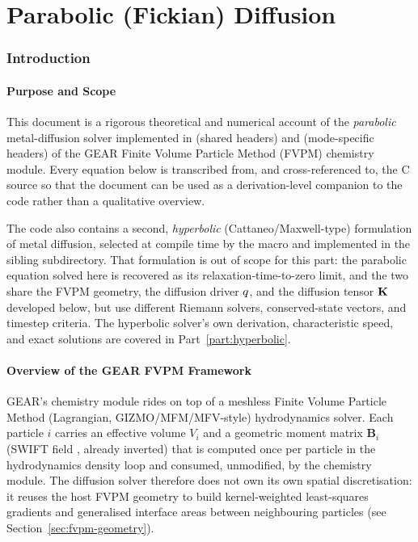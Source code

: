 
\part{Parabolic (Fickian) Diffusion}
\label{part:parabolic}

\section{Introduction}

\subsection{Purpose and Scope}
\label{sec:parabolic-scope}
This document is a rigorous theoretical and numerical account of the
\emph{parabolic} metal-diffusion solver implemented in
 (shared headers) and
 (mode-specific headers)
of the GEAR Finite Volume Particle Method (FVPM) chemistry module. Every
equation below is transcribed from, and cross-referenced to, the C source
so that the document can be used as a derivation-level companion to the
code rather than a qualitative overview.

The code also contains a second, \emph{hyperbolic} (Cattaneo/Maxwell-type)
formulation of metal diffusion, selected at compile time by the macro
 and implemented in the
sibling  subdirectory. That formulation is out of scope
for this part: the parabolic equation solved here is recovered as its
relaxation-time-to-zero limit, and the two share the FVPM geometry, the
diffusion driver $q$, and the diffusion tensor $\mathbf{K}$ developed
below, but use different Riemann solvers, conserved-state vectors, and
timestep criteria. The hyperbolic solver's own derivation, characteristic
speed, and exact solutions are covered in Part~\ref{part:hyperbolic}.

\subsection{Overview of the GEAR FVPM Framework}
GEAR's chemistry module rides on top of a meshless Finite Volume Particle
Method (Lagrangian, GIZMO/MFM/MFV-style) hydrodynamics solver. Each particle
$i$ carries an effective volume $V_i$ and a geometric moment matrix
$\mathbf{B}_i$ (SWIFT field , already inverted)
that is computed once per particle in the hydrodynamics density loop and
consumed, unmodified, by the chemistry module. The diffusion solver
therefore does not own its own spatial discretisation: it reuses the
host FVPM geometry to build kernel-weighted least-squares gradients and
generalised interface areas between neighbouring particles (see
Section~\ref{sec:fvpm-geometry}).


